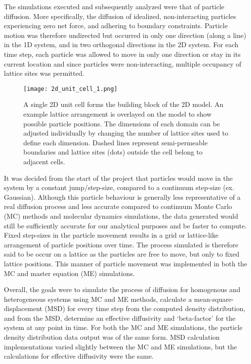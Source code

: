 	The simulations executed and subsequently analyzed were that of particle diffusion. More specifically, the diffusion of idealized, non-interacting particles experiencing zero net force, and adhering to boundary constraints. Particle motion was therefore undirected but occurred in only one direction (along a line) in the 1D system, and in two orthogonal directions in the 2D system. For each time step, each particle was allowed to move in only one direction or stay in its current location and since particles were non-interacting, multiple occupancy of lattice sites was permitted.
	
	\begin{figure}[h]
		\centering
		\texttt{[image: 2d\_unit\_cell\_1.png]}
		\caption[The heterogeneous 2D unit cell]{A single 2D unit cell forms the building block of the 2D model. An example lattice arrangement is overlayed on the model to show possible particle positions. The dimensions of each domain can be adjusted individually by changing the number of lattice sites used to define each dimension. Dashed lines represent semi-permeable boundaries and lattice sites (dots) outside the cell belong to adjacent cells.}
		\label{fig:2d_unit_cell_1.png}
	\end{figure}

	\newpage
	It was decided from the start of the project that particles would move in the system by a constant jump/step-size, compared to a continuum step-size (ex. Gaussian). Although this particle behaviour is generally less representative of a real diffusion process and less accurate compared to continuum Monte Carlo (MC) methods and molecular dynamics simulations, the data generated would still be sufficiently accurate for our analytical purposes and be faster to compute. Fixed step-sizes in the particle movement results in a grid or lattice-like arrangement of particle positions over time. The process simulated is therefore said to be occur on a lattice as the particles are free to move, but only to fixed lattice positions. This manner of particle movement was implemented in both the MC and master equation (ME) simulations.

	Overall, the goals were to simulate the process of diffusion for homogenous and heterogeneous systems using MC and ME methods, calculate a mean-square-displacement (MSD) for every time step from the computed density distribution, and from the MSD, determine an effective diffusivity and `beta-factor' for the system at any point in time. For both the MC and ME simulations, the particle density distribution data output was of the same form. MSD calculation implementations varied slightly between the MC and ME simulations, but the calculations for effective diffusivity were the same. 	

